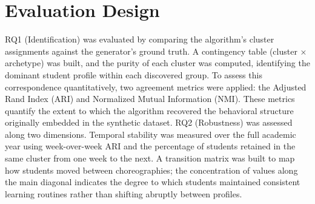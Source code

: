 \section{Evaluation Design}
\label{sec:evaluation-design}
%
%
%
%
%
RQ1 (Identification) was evaluated by comparing the algorithm's cluster assignments against the generator's ground truth. A contingency table (cluster × archetype) was built, and the purity of each cluster was computed, identifying the dominant student profile within each discovered group. To assess this correspondence quantitatively, two agreement metrics were applied: the Adjusted Rand Index (ARI) and Normalized Mutual Information (NMI). These metrics quantify the extent to which the algorithm recovered the behavioral structure originally embedded in the synthetic dataset.
RQ2 (Robustness) was assessed along two dimensions. Temporal stability was measured over the full academic year using week-over-week ARI and the percentage of students retained in the same cluster from one week to the next. A transition matrix was built to map how students moved between choreographies; the concentration of values along the main diagonal indicates the degree to which students maintained consistent learning routines rather than shifting abruptly between profiles.
